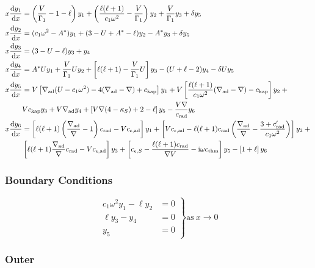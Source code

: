 \documentclass[fleqn]{article}
\newcommand{\diff}{\ensuremath{\mathrm{d}}}
\newcommand{\ii}{\ensuremath{\mathrm{i}}}
\newcommand{\Vg}{\ensuremath{\frac{V}{\Gamma_{1}}}}
\newcommand{\As}{\ensuremath{A^{\ast}}}
\newcommand{\nabad}{\ensuremath{\nabla_{\rm ad}}}
\newcommand{\kapS}{\ensuremath{\kappa_{S}}}
\newcommand{\crad}{\ensuremath{c_{\rm rad}}}
\newcommand{\cepsad}{\ensuremath{c_{\epsilon,{\rm ad}}}}
\newcommand{\cepsS}{\ensuremath{c_{\epsilon,S}}}
\newcommand{\cthm}{\ensuremath{c_{\rm thm}}}
\newcommand{\ckap}{\ensuremath{c_{\rm kap}}}
\begin{document}
\begin{align*}
x \frac{\diff y_{1}}{\diff x} &=
\left(\Vg - 1 - \ell \right) y_{1} +
\left(\frac{\ell(\ell+1)}{c_{1} \omega^{2}} - \Vg \right) y_{2} +
\Vg y_{3} +
\delta y_{5} \\
x \frac{\diff y_{2}}{\diff x} &=
(c_{1} \omega^{2} - \As ) y_{1} +
(3 - U + \As - \ell) y_{2} -
\As y_{3} +
\delta y_{5} \\
x \frac{\diff y_{3}}{\diff x} &=
(3 - U - \ell) y_{3} +
y_{4} \\
x \frac{\diff y_{4}}{\diff x} &=
\As U y_{1} +
\Vg U y_{2} +
\left[ \ell(\ell+1) - \Vg U \right] y_{3} -
(U + \ell - 2) y_{4}
- \delta U y_{5} \\
x \frac{\diff y_{5}}{\diff x} &=
V \left[ \nabad (U - c_{1}\omega^{2}) - 4 (\nabad - \nabla) + \ckap \right] y_{1} + 
V \left[ \frac{\ell(\ell+1)}{c_{1} \omega^{2}} (\nabad - \nabla) - \ckap \right] y_{2} + \mbox{} \\
& 
V \ckap y_{3} + 
V \nabad y_{4} + 
\left[ V \nabla (4 - \kapS) + 2 - \ell \right] y_{5} -
\frac{V \nabla}{\crad} y_{6} \\
x \frac{\diff y_{6}}{\diff x} &=
\left[ \ell(\ell+1)\left( \frac{\nabad}{\nabla} - 1 \right) \crad - V \cepsad \right] y_{1} +
\left[ V \cepsad - \ell(\ell+1)\crad \left( \frac{\nabad}{\nabla} - \frac{3 + \crad'}{c_{1}\omega^{2}} \right) \right] y_{2} + \mbox{} \\
&
\left[ \ell(\ell+1) \frac{\nabad}{\nabla} \crad - V \cepsad \right] y_{3} +
\left[ \cepsS - \frac{\ell(\ell+1)\crad}{\nabla V} - \ii \omega \cthm\right] y_{5} -
\left[ 1 + \ell \right] y_{6}
\end{align*}

\subsubsection*{Boundary Conditions}

\begin{equation*}
\left.
\begin{aligned}
c_{1} \omega^{2} y_{1} - \ell y_{2} &= 0 \\
\ell y_{3} - y_{4} &= 0 \\
y_{5} &= 0
\end{aligned}
\right\}
\text{as}\ x \rightarrow 0
\end{equation*}

\subsubsection*{Outer}
\end{document}
